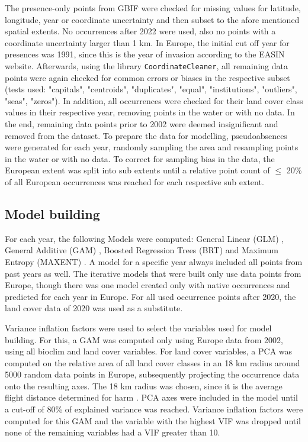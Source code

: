 \documentclass[12pt,a4paper]{article}
\begin{document}
The presence-only points from GBIF were checked for missing values for latitude, longitude, year or coordinate uncertainty and then subset to the afore mentioned spatial extents.
No occurrences after 2022 were used, also no points with a coordinate uncertainty larger than 1 km.
In Europe, the initial cut off year for presences was 1991, since this is the year of invasion according to the EASIN website.
Afterwards, using the library \texttt{CoordinateCleaner}, all remaining data points were again checked for common errors or biases in the respective subset (tests used: "capitals", "centroids", "duplicates", "equal", "institutions", "outliers", "seas", "zeros").
In addition, all occurrences were checked for their land cover class values in their respective year, removing points in the water or with no data.
In the end, remaining data points prior to 2002 were deemed insignificant and removed from the dataset.
To prepare the data for modelling, pseudoabsences were generated for each year, randomly sampling the area and resampling points in the water or with no data.
To correct for sampling bias in the data, the European extent was split into sub extents until a relative point count of $\leq$ 20\% of all European occurrences was reached for each respective sub extent.

\subsection{Model building}
For each year, the following Models were computed: General Linear (GLM) \autocite{guisan2002glm-gam}, General Additive (GAM) \autocite{guisan2002glm-gam}, Boosted Regression Trees (BRT) \autocite{elith2008brt} and Maximum Entropy (MAXENT) \autocite{phillips2017maxnet}.
A model for a specific year always included all points from past years as well.
The iterative models that were built only use data points from Europe, though there was one model created only with native occurrences and predicted for each year in Europe.
For all used occurrence points after 2020, the land cover data of 2020 was used as a substitute.

Variance inflation factors were used to select the variables used for model building.
For this, a GAM was computed only using Europe data from 2002, using all bioclim and land cover variables.
For land cover variables, a PCA was computed on the relative area of all land cover classes in an 18 km radius around 5000 random data points in Europe, subsequently projecting the occurrence data onto the resulting axes.
The 18 km radius was chosen, since it is the average flight distance determined for \gls{harm} \autocite{jeffries2013flightharmonia}.
PCA axes were included in the model until a cut-off of 80\% of explained variance was reached.
Variance inflation factors were computed for this GAM and the variable with the highest VIF was dropped until none of the remaining variables had a VIF greater than 10.
\end{document}
